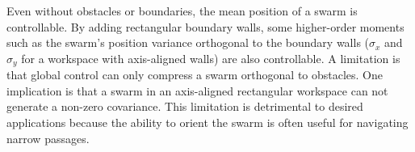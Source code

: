 Even without obstacles or boundaries, the mean position of a swarm is controllable.  By adding rectangular boundary walls, some higher-order moments such as the swarm's position variance orthogonal to the boundary walls ($\sigma_x$ and $\sigma_y$ for a workspace with axis-aligned walls) are also controllable. 
A limitation is that global control can only compress a swarm orthogonal to obstacles.  One implication is that a swarm in an axis-aligned rectangular workspace can not generate a non-zero covariance. This limitation is detrimental to desired applications because the ability to orient the swarm is often useful for navigating narrow passages.

